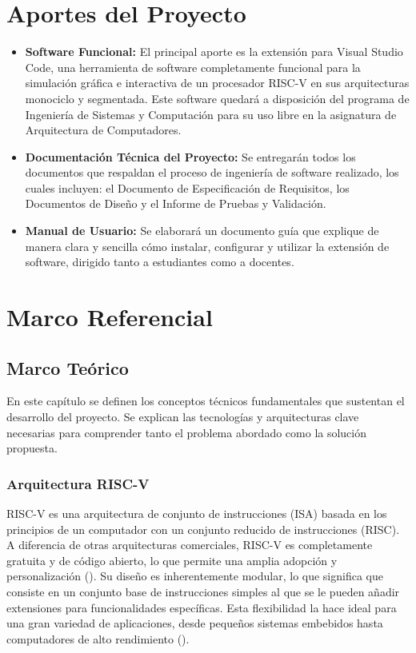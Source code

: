\documentclass[12pt, letterpaper]{article}
\begin{document}
\section{Aportes del Proyecto}
\begin{itemize}
    \item \textbf{Software Funcional:} El principal aporte es la extensión para Visual Studio Code, una herramienta de software completamente funcional para la simulación gráfica e interactiva de un procesador RISC-V en sus arquitecturas monociclo y segmentada. Este software quedará a disposición del programa de Ingeniería de Sistemas y Computación para su uso libre en la asignatura de Arquitectura de Computadores.
    \item \textbf{Documentación Técnica del Proyecto:} Se entregarán todos los documentos que respaldan el proceso de ingeniería de software realizado, los cuales incluyen: el Documento de Especificación de Requisitos, los Documentos de Diseño y el Informe de Pruebas y Validación.
    \item \textbf{Manual de Usuario:} Se elaborará un documento guía que explique de manera clara y sencilla cómo instalar, configurar y utilizar la extensión de software, dirigido tanto a estudiantes como a docentes.
\end{itemize}


\section{Marco Referencial}

\subsection{Marco Teórico}
En este capítulo se definen los conceptos técnicos fundamentales que sustentan el desarrollo del proyecto. Se explican las tecnologías y arquitecturas clave necesarias para comprender tanto el problema abordado como la solución propuesta.

\subsubsection{Arquitectura RISC-V}
RISC-V es una arquitectura de conjunto de instrucciones (ISA) basada en los principios de un computador con un conjunto reducido de instrucciones (RISC). A diferencia de otras arquitecturas comerciales, RISC-V es completamente gratuita y de código abierto, lo que permite una amplia adopción y personalización (\cite{poojary2025}). Su diseño es inherentemente modular, lo que significa que consiste en un conjunto base de instrucciones simples al que se le pueden añadir extensiones para funcionalidades específicas. Esta flexibilidad la hace ideal para una gran variedad de aplicaciones, desde pequeños sistemas embebidos hasta computadores de alto rendimiento (\cite{mallidu2023}).
\end{document}
